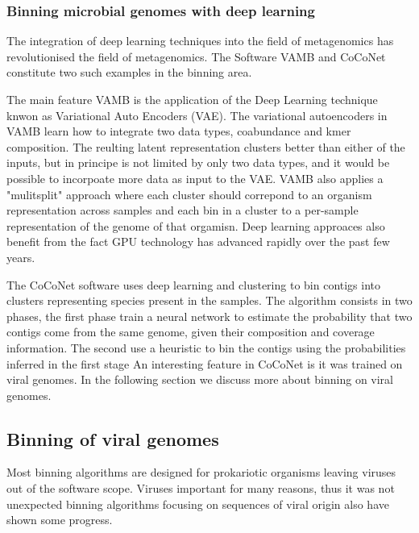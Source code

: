 \documentclass{article}
\begin{document}
\subsubsection{Binning microbial genomes with deep learning}
The integration of deep learning techniques into the field of metagenomics has revolutionised the field of metagenomics. The Software VAMB and CoCoNet constitute two such examples in the binning area.

The main feature VAMB is the application of the Deep Learning technique knwon as Variational Auto Encoders (VAE). The variational autoencoders in VAMB learn how to integrate two data types, coabundance and kmer composition. The reulting latent representation clusters better than either of the inputs, but in principe is not limited by only two data types, and it would be possible to incorpoate more data as input to the VAE.
VAMB also applies a "mulitsplit" approach where each cluster should correpond to an organism representation across samples and each bin in a cluster to a per-sample representation of the genome of that orgamisn.
Deep learning approaces also benefit from the fact GPU technology has advanced rapidly over the past few years.

The CoCoNet software uses deep learning and clustering to bin contigs into clusters representing species present in the samples. The algorithm consists in two phases, the first phase train a neural network to estimate the probability that two contigs come from the same genome, given their composition and coverage information. The second use a heuristic to bin the contigs using the probabilities inferred in the first stage
An interesting feature in CoCoNet is it was trained on viral genomes. In the following section we discuss more about binning on viral genomes. 

\subsection{Binning of viral genomes}

Most binning algorithms are designed for prokariotic organisms leaving viruses out of the software scope. Viruses important for many reasons, thus it was not unexpected binning algorithms focusing on sequences of viral origin also have shown some progress. 
\end{document}
